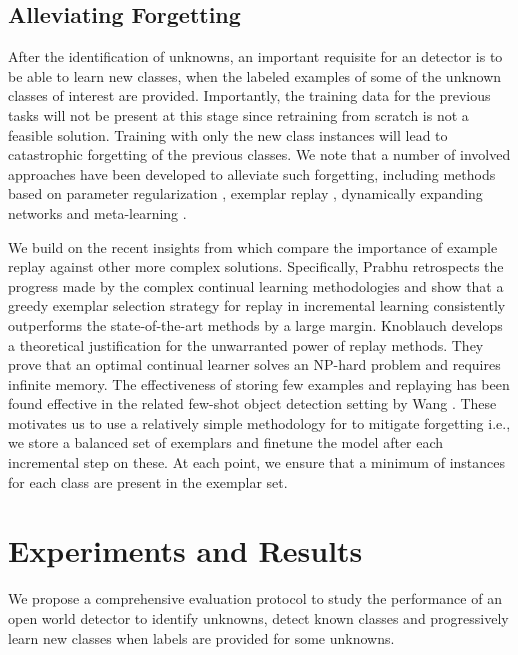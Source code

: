 \documentclass[final]{cvpr}
\begin{document}
\subsection{Alleviating Forgetting}
After the identification of unknowns, an important requisite for an \ow  detector is to be able to learn new classes, when the labeled examples of some of the unknown classes of interest are provided. 
Importantly, the training data for the previous tasks will not be present at this stage since retraining from scratch is not a feasible solution. Training with only the new class instances will lead to catastrophic forgetting \cite{mccloskey1989catastrophic,french1999catastrophic} of the previous classes.
We note that a number of involved approaches have been developed to alleviate such forgetting, including methods based on parameter regularization \cite{aljundi2018memory,kirkpatrick2017overcoming,li2018learning,zenke2017continual}, exemplar replay \cite{AGEM,rebuffi2017icarl,lopez2017gradient,castro2018end}, dynamically expanding networks \cite{mallya2018packnet,serra2018overcoming,rusu2016progressive} and meta-learning \cite{rajasegaran2020itaml,kj2020meta}. 

We build on the recent insights from \cite{prabhu2020gdumb,knoblauch2020optimal,wang2020frustratingly} which compare the importance of example replay against other more complex solutions. Specifically, Prabhu \etal \cite{prabhu2020gdumb} retrospects the progress made by the complex continual learning methodologies and show that a greedy exemplar selection strategy for replay in incremental learning  consistently outperforms the state-of-the-art methods by a large margin. Knoblauch \etal \cite{knoblauch2020optimal} develops a theoretical justification for the unwarranted power of replay methods. They prove that an optimal continual learner solves an NP-hard problem and requires infinite memory. The effectiveness of storing few examples and replaying has been found effective in the related few-shot object detection setting by Wang \etal \cite{wang2020frustratingly}. These motivates us to use a relatively simple methodology for \method to mitigate forgetting i.e., we store a balanced set of exemplars and finetune the model after each incremental step on these. At each point, we ensure that a minimum of  instances for each class are present in the exemplar set.



\section{Experiments and Results} \label{sec:expr_and_results}
We propose a comprehensive evaluation protocol to study the performance of an open world detector to identify unknowns, detect known classes and progressively learn new classes when labels are provided for some unknowns. 
\end{document}
